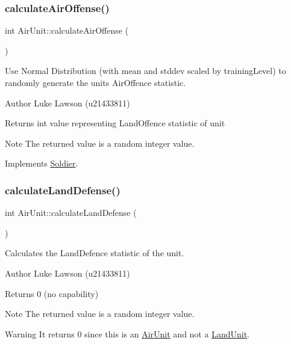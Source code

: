 \subsubsection{\texorpdfstring{calculateAirOffense()}{calculateAirOffense()}}
{\footnotesize\ttfamily int Air\+Unit\+::calculate\+Air\+Offense (\begin{DoxyParamCaption}{ }\end{DoxyParamCaption})\hspace{0.3cm}{\ttfamily [virtual]}}



Use Normal Distribution (with mean and stddev scaled by training\+Level) to randomly generate the unit\textquotesingle{}s Air\+Offence statistic. 

\begin{DoxyAuthor}{Author}
Luke Lawson (u21433811) 
\end{DoxyAuthor}
\begin{DoxyReturn}{Returns}
int value representing Land\+Offence statistic of unit 
\end{DoxyReturn}
\begin{DoxyNote}{Note}
The returned value is a random integer value. 
\end{DoxyNote}


Implements \mbox{\hyperlink{class_soldier_ad5290f69e84772e9a3bfc060b5d348a0}{Soldier}}.

\mbox{\label{class_air_unit_a5d408669d099d55d1bb19f71d6dc8712}} 
\subsubsection{\texorpdfstring{calculateLandDefense()}{calculateLandDefense()}}
{\footnotesize\ttfamily int Air\+Unit\+::calculate\+Land\+Defense (\begin{DoxyParamCaption}{ }\end{DoxyParamCaption})\hspace{0.3cm}{\ttfamily [virtual]}}



Calculates the Land\+Defence statistic of the unit. 

\begin{DoxyAuthor}{Author}
Luke Lawson (u21433811) 
\end{DoxyAuthor}
\begin{DoxyReturn}{Returns}
0 (no capability) 
\end{DoxyReturn}
\begin{DoxyNote}{Note}
The returned value is a random integer value. 
\end{DoxyNote}
\begin{DoxyWarning}{Warning}
It returns 0 since this is an \mbox{\hyperlink{class_air_unit}{Air\+Unit}} and not a \mbox{\hyperlink{class_land_unit}{Land\+Unit}}. 
\end{DoxyWarning}


